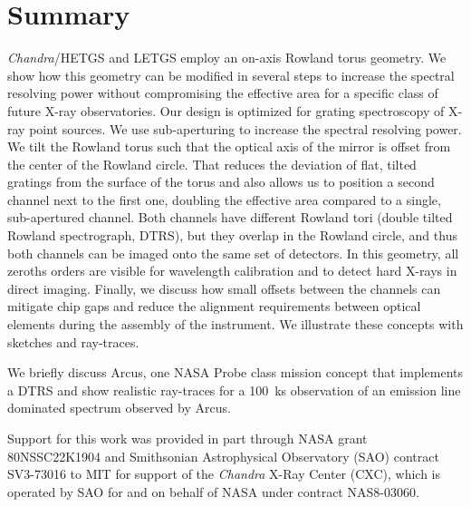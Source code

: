 \documentclass[linenumbers]{aastex631}
\begin{document}
\section{Summary}
\label{sect:summary}
\emph{Chandra}/HETGS and LETGS employ an on-axis Rowland torus geometry. We show how this geometry can be modified in several steps to increase the spectral resolving power without compromising the effective area for a specific class of future X-ray observatories. Our design is optimized for grating spectroscopy of X-ray point sources. We use sub-aperturing to increase the spectral resolving power. We tilt the Rowland torus such that the optical axis of the mirror is offset from the center of the Rowland circle. That reduces the deviation of flat, tilted gratings from the surface of the torus and also allows us to position a second channel next to the first one, doubling the effective area compared to a single, sub-apertured channel. Both channels have different Rowland tori (double tilted Rowland spectrograph, DTRS), but they overlap in the Rowland circle, and thus both channels can be imaged onto the same set of detectors. In this geometry, all zeroths orders are visible for wavelength calibration and to detect hard X-rays in direct imaging. Finally, we discuss how small offsets between the channels can mitigate chip gaps and reduce the alignment requirements between optical elements during the assembly of the instrument. We illustrate these concepts with sketches and ray-traces.

We briefly discuss Arcus, one NASA Probe class mission concept that implements a DTRS and show realistic ray-traces for a 100~ks observation of an emission line dominated spectrum observed by Arcus.


\begin{acknowledgements}
Support for this work was provided in part through NASA grant 80NSSC22K1904 and Smithsonian Astrophysical Observatory (SAO)
contract SV3-73016 to MIT for support of the {\em Chandra} X-Ray Center (CXC),
which is operated by SAO for and on behalf of NASA under contract NAS8-03060.
\end{acknowledgements}


{}



\end{document}
